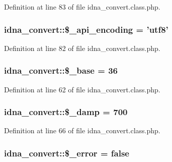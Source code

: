 Definition at line 83 of file idna\-\_\-convert.\-class.\-php.

\hypertarget{classidna__convert_abc9b2aaad4b02a40602f254ac44ab973}{
\subsubsection[{\$\-\_\-api\-\_\-encoding}]{\setlength{\rightskip}{0pt plus 5cm}idna\-\_\-convert\-::\$\-\_\-api\-\_\-encoding = 'utf8'\hspace{0.3cm}{\ttfamily [protected]}}}\label{classidna__convert_abc9b2aaad4b02a40602f254ac44ab973}


Definition at line 82 of file idna\-\_\-convert.\-class.\-php.

\hypertarget{classidna__convert_ae8b8b5bddd4d164dea30f7097274ac24}{
\subsubsection[{\$\-\_\-base}]{\setlength{\rightskip}{0pt plus 5cm}idna\-\_\-convert\-::\$\-\_\-base = 36\hspace{0.3cm}{\ttfamily [protected]}}}\label{classidna__convert_ae8b8b5bddd4d164dea30f7097274ac24}


Definition at line 62 of file idna\-\_\-convert.\-class.\-php.

\hypertarget{classidna__convert_af291107adc3fc7062e734fe5654a5b4c}{
\subsubsection[{\$\-\_\-damp}]{\setlength{\rightskip}{0pt plus 5cm}idna\-\_\-convert\-::\$\-\_\-damp = 700\hspace{0.3cm}{\ttfamily [protected]}}}\label{classidna__convert_af291107adc3fc7062e734fe5654a5b4c}


Definition at line 66 of file idna\-\_\-convert.\-class.\-php.

\hypertarget{classidna__convert_ae3825ac4f637ed992ef96f261647c396}{
\subsubsection[{\$\-\_\-error}]{\setlength{\rightskip}{0pt plus 5cm}idna\-\_\-convert\-::\$\-\_\-error = false\hspace{0.3cm}{\ttfamily [protected]}}}\label{classidna__convert_ae3825ac4f637ed992ef96f261647c396}


